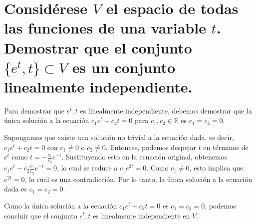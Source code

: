 \section{Considérese $V$ el espacio de todas las funciones de una variable $t$. Demostrar que el conjunto $\{e^t, t\} \subset V$ es un conjunto linealmente independiente.}

Para demostrar que ${e^t, t}$ es linealmente independiente, debemos demostrar que la única solución a la ecuación $c_1 e^t + c_2 t = 0$ para $c_1, c_2 \in \mathbb{R}$ es $c_1 = c_2 = 0$.

Supongamos que existe una solución no trivial a la ecuación dada, es decir, $c_1 e^t + c_2 t = 0$ con $c_1 \neq 0$ o $c_2 \neq 0$. Entonces, podemos despejar $t$ en términos de $e^t$ como $t = -\frac{c_1}{c_2} e^{-t}$. Sustituyendo esto en la ecuación original, obtenemos $c_1 e^t - c_2 \frac{c_1}{c_2} e^{-t} = 0$, lo cual se reduce a $c_1 e^{2t} = 0$. Como $c_1 \neq 0$, esto implica que $e^{2t} = 0$, lo cual es una contradicción. Por lo tanto, la única solución a la ecuación dada es $c_1 = c_2 = 0$.

Como la única solución a la ecuación $c_1 e^t + c_2 t = 0$ es $c_1 = c_2 = 0$, podemos concluir que el conjunto ${e^t, t}$ es linealmente independiente en $V$.
